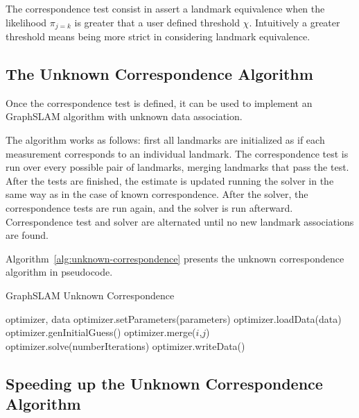 The correspondence test consist in assert a landmark equivalence when the likelihood $\pi_{j=k}$ is greater that a user defined threshold $\chi$. Intuitively a greater threshold means being more strict in considering landmark equivalence.



\subsection{The Unknown Correspondence Algorithm}

Once the correspondence test is defined, it can be used to implement an GraphSLAM algorithm with unknown data association. 

The algorithm works as follows: first all landmarks are initialized as if each measurement corresponds to an individual landmark. The correspondence test is run over every possible pair of landmarks, merging landmarks that pass the test. After the tests are finished, the estimate is updated running the solver in the same way as in the case of known correspondence. After the solver, the correspondence tests are run again, and the solver is run afterward. Correspondence test and solver are alternated until no new landmark associations are found. 

Algorithm~\ref{alg:unknown-correspondence} presents the unknown correspondence algorithm in pseudocode. 

\begin{algorithm}[htbp!]
    \caption{GraphSLAM Unknown Correspondence}
    \label{alg:unknown-correspondence}
    \begin{algorithmic}[1]
        \Require optimizer, data
        \State optimizer.setParameters(parameters)
        \State optimizer.loadData(data)
        \State optimizer.genInitialGuess()
        \State
                    \State optimizer.merge($i$,$j$) 
                \EndIf 
            \EndFor
            \State optimizer.solve(numberIterations)
        \EndWhile
        \State
        \State optimizer.writeData()
    \end{algorithmic}
\end{algorithm}

\subsection{Speeding up the Unknown Correspondence Algorithm}

